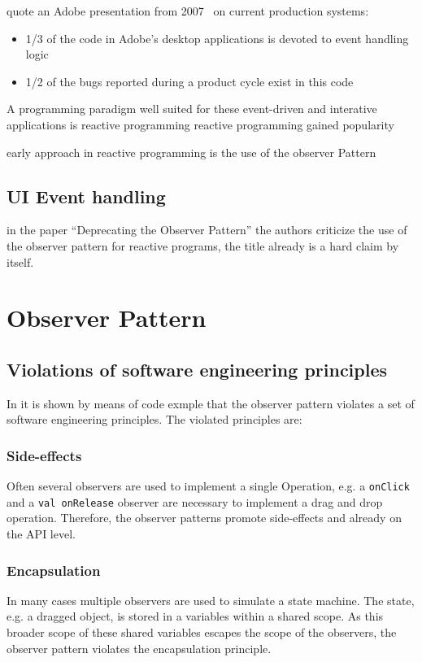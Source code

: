 \documentclass[format=acmtog]{acmart}
\begin{document}
	quote an Adobe presentation from 2007~\cite{parent2006possible} on current production systems:
	\begin{itemize}
		\item 1/3 of the code in Adobe’s desktop applications is devoted to event handling logic	
		\item 1/2 of the bugs reported during a product cycle exist in this code
	\end{itemize}


	
	A programming paradigm well suited for these event-driven and interative applications is reactive programming
	reactive programming gained popularity

	early approach in reactive programming is the use of the observer Pattern
	
	\subsection{UI Event handling}



	in the paper ``Deprecating the Observer Pattern'' the authors criticize the use of the observer pattern for reactive programs,
	the title already is a hard claim by itself.



\section{Observer Pattern}
	\cite{Gamma:1995}

	\subsection{Violations of software engineering principles}
		In \cite{Maier:2012} it is shown by means of code exmple that the observer pattern violates a set of software engineering principles.
		The violated principles are:

		\subsubsection{Side-effects}
			Often several observers are used to implement a single Operation,
			e.g. a \lstinline|onClick| and a \lstinline|val onRelease| observer are necessary to implement a drag and drop operation.
			Therefore, the observer patterns promote side-effects and already on the API level.

		\subsubsection{Encapsulation}
			In many cases multiple observers are used to simulate a state machine. 
			The state, e.g. a dragged object, is stored in a variables within a shared scope.
			As this broader scope of these shared variables escapes the scope of the observers, the observer pattern violates the encapsulation principle.
			
\end{document}
